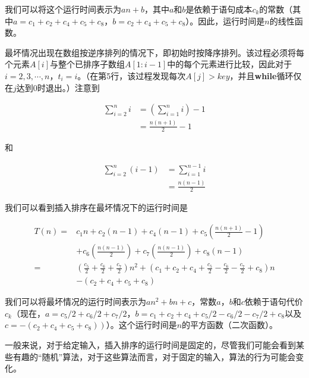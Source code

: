 \documentclass[lang=cn,newtx,10pt,scheme=chinese]{elegantbook}
\begin{document}
我们可以将这个运行时间表示为$an+b$，其中$a$和$b$是依赖于语句成本$c_k$的常数（其中$a = c_1 + c_2 + c_4 + c_5 + c_8$，$b = c_2 + c_4 + c_5 + c_8$）。因此，运行时间是$n$的线性函数。

最坏情况出现在数组按逆序排列的情况下，即初始时按降序排列。该过程必须将每个元素$A[i]$与整个已排序子数组$A[1:i-1]$中的每个元素进行比较，因此对于$i=2,3,\cdots,n$，$t_i = i$。（在第5行，该过程发现每次$A[j] > key$，并且\textbf{while}循环仅在$j$达到0时退出。）注意到

\begin{equation*}
\begin{aligned}
\sum_{i=2}^n i & =\left(\sum_{i=1}^n i\right)-1 \\
& =\frac{n(n+1)}{2}-1
\end{aligned}
\end{equation*}

和

\begin{equation*}
\begin{aligned}
\sum_{i=2}^n(i-1) & =\sum_{i=1}^{n-1} i \\
& =\frac{n(n-1)}{2}
\end{aligned}
\end{equation*}

我们可以看到插入排序在最坏情况下的运行时间是

\begin{equation}\label{eq:2.2}
\begin{aligned}
T(n)= & c_1 n+c_2(n-1)+c_4(n-1)+c_5\left(\frac{n(n+1)}{2}-1\right) \\
& +c_6\left(\frac{n(n-1)}{2}\right)+c_7\left(\frac{n(n-1)}{2}\right)+c_8(n-1) \\
= & \left(\frac{c_5}{2}+\frac{c_6}{2}+\frac{c_7}{2}\right) n^2+\left(c_1+c_2+c_4+\frac{c_5}{2}-\frac{c_6}{2}-\frac{c_7}{2}+c_8\right) n \\
& -\left(c_2+c_4+c_5+c_8\right)
\end{aligned}
\end{equation}

我们可以将最坏情况的运行时间表示为$an^2+bn+c$，常数$a$，$b$和$c$依赖于语句代价$c_k$（现在，$a=c_5 / 2+c_6 / 2+c_7 / 2$，$b=c_1+c_2+c_4+c_5 / 2-c_6 / 2-c_7 / 2+c_8$以及$\left.c=-\left(c_2+c_4+c_5+c_8\right)\right)$）。这个运行时间是$n$的平方函数（二次函数）。

一般来说，对于给定输入，插入排序的运行时间是固定的，尽管我们可能会看到某些有趣的``随机''算法，对于这些算法而言，对于固定的输入，算法的行为可能会变化。
\end{document}
